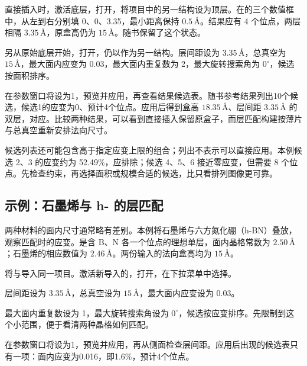 直接插入时，激活底层，打开，将项目中的另一结构设为顶层。在的三个数值框中，从左到右分别填 0、0、3.35，最小距离保持 $0.5\,\text{\AA}$。结果应有 4 个位点，两层相隔 $3.35\,\text{\AA}$，原盒高仍为 $15\,\text{\AA}$。随书保留了这个状态。

另从原始底层开始，打开，仍以作为另一结构。层间距设为 $3.35\,\text{\AA}$，总真空为 $15\,\text{\AA}$，最大面内应变为 0.03，最大面内重复数为 2，最大旋转搜索角为 $0^\circ$，候选按面积排序。

在参数窗口将设为1，预览并应用，再查看结果候选表。随书参考结果列出10个候选，候选1的应变为0、预计4个位点。应用后得到盒高 $18.35\,\text{\AA}$、层间距 $3.35\,\text{\AA}$ 的双层，对应。比较两种结果，可以看到直接插入保留原盒子，而层匹配构建按薄片与总真空重新安排法向尺寸。

候选列表还可能包含高于指定应变上限的组合；列出不表示可以直接应用。本例候选 2、3 的应变约为 52.49\%，应排除；候选 4、5、6 接近零应变，但需要 8 个位点。先检查约束，再选择面积或规模合适的候选，比只看排列图像更可靠。

\subsection{示例：石墨烯与 h- 的层匹配}

两种材料的面内尺寸通常略有差别。本例将石墨烯与六方氮化硼（h-BN）叠放，观察匹配时的应变。是含 B、N 各一个位点的理想单层，面内晶格常数为 $2.50\,\text{\AA}$；石墨烯的相应数值为 $2.46\,\text{\AA}$。两份输入的法向盒高均为 $15\,\text{\AA}$。

\begin{steps}
  \item 将与导入同一项目。激活新导入的，打开，在下拉菜单中选择。
  \item 层间距设为 $3.35\,\text{\AA}$，总真空设为 $15\,\text{\AA}$，最大面内应变设为 0.03。
  \item 最大面内重复数设为 1，最大旋转搜索角设为 $0^\circ$，候选按应变排序。先限制到这个小范围，便于看清两种晶格如何匹配。
  \item 在参数窗口将设为1，预览并应用，再从侧面检查层间距。应用后出现的候选表只有一项：面内应变为0.016，即1.6\%，预计4个位点。
\end{steps}

